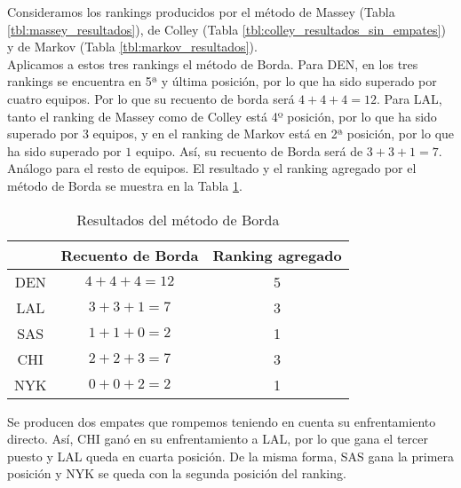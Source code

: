 \begin{ejemplo}
Consideramos los rankings producidos por el método de Massey (Tabla \ref{tbl:massey_resultados}), de Colley (Tabla \ref{tbl:colley_resultados_sin_empates}) y de Markov (Tabla \ref{tbl:markov_resultados}).\\

Aplicamos a estos tres rankings el método de Borda. Para DEN, en los tres rankings se encuentra en 5ª y última posición, por lo que ha sido superado por cuatro equipos. Por lo que su recuento de borda será $4 + 4 + 4 = 12$. Para LAL, tanto el ranking de Massey como de Colley está 4º posición, por lo que ha sido superado por $3$ equipos, y en el ranking de Markov está en 2ª posición, por lo que ha sido superado por $1$ equipo. Así, su recuento de Borda será de $3 + 3 + 1 = 7$. Análogo para el resto de equipos. El resultado y el ranking agregado por el método de Borda se muestra en la Tabla \ref{tbl:borda_resultados}.\\


\begin{table}[h]
\centering
\caption{Resultados del método de Borda}
\label{tbl:borda_resultados}
\begin{tabular}{@{}ccc@{}}
\cmidrule(l){2-3}
    & Recuento de Borda & Ranking agregado \\ \midrule
DEN & $4 + 4 + 4 = 12$       & 5       \\
LAL & $3 + 3 + 1 =  7$       & 3       \\
SAS & $1 + 1 + 0 =  2$       & 1       \\
CHI & $2 + 2 + 3 =  7$       & 3       \\
NYK & $0 + 0 + 2 =  2$       & 1       \\ \bottomrule
\end{tabular}
\end{table}

Se producen dos empates que rompemos teniendo en cuenta su enfrentamiento directo. Así, CHI ganó en su enfrentamiento a LAL, por lo que gana el tercer puesto y LAL queda en cuarta posición. De la misma forma, SAS gana la primera posición y NYK se queda con la segunda posición del ranking. 

\end{ejemplo}


